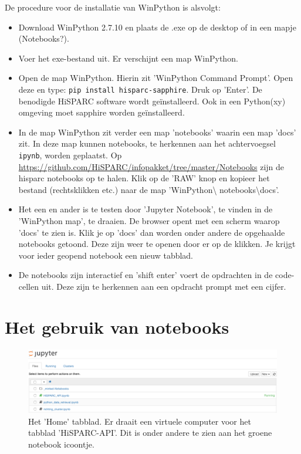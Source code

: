 De procedure voor de installatie van WinPython is alsvolgt:
\begin{itemize}
\item Download WinPython 2.7.10 en plaats de .exe op de desktop of in een mapje (Notebooks?).
\item Voer het exe-bestand uit. Er verschijnt een map WinPython.
\item Open de map WinPython. Hierin zit 'WinPython Command Prompt'. Open deze en type:
 {\tt pip install hisparc-sapphire}. Druk op 'Enter'. De benodigde HiSPARC software wordt ge\"{i}nstalleerd.
 Ook in een Python(xy) omgeving moet sapphire worden ge\"{i}nstalleerd.
\item In de map WinPython zit verder een map 'notebooks' waarin een map 'docs' zit. In deze map kunnen notebooks,
te herkennen aan het achtervoegsel {\tt ipynb}, worden geplaatst.
Op \url{https://github.com/HiSPARC/infopakket/tree/master/Notebooks} zijn de hisparc notebooks op te halen. Klik
op de 'RAW' knop en kopieer het bestand (rechtsklikken etc.) naar de map 'WinPython\textbackslash
notebooks\textbackslash docs'.
\item Het een en ander is te testen door 'Jupyter Notebook', te vinden in de 'WinPython map', te draaien. De browser
opent met een scherm waarop 'docs' te zien is. Klik je op 'docs' dan worden onder andere de opgehaalde notebooks
getoond. Deze zijn weer te openen door er op de klikken. Je krijgt voor ieder geopend notebook een nieuw tabblad.
\item De notebooks zijn interactief en 'shift enter' voert de opdrachten in de code-cellen uit. Deze zijn te herkennen aan
een opdracht prompt met een cijfer.
\end{itemize}

\section{Het gebruik van notebooks}

\begin{figure}[H]
\includegraphics[width=16cm]{home.png}
\caption{Het 'Home' tabblad. Er draait een virtuele computer voor het tabblad 'HiSPARC-API'. Dit is onder andere te zien
aan het groene notebook icoontje.}
\end{figure}

